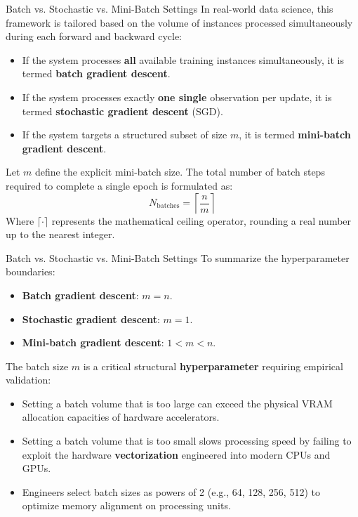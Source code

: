 \begin{frame}{Batch vs. Stochastic vs. Mini-Batch Settings}
	In real-world data science, this framework is tailored based on the volume of instances processed simultaneously during each forward and backward cycle:
	\begin{itemize}
		\item If the system processes \textbf{all} available training instances simultaneously, it is termed \textbf{batch gradient descent}.
		\pause
		\item If the system processes exactly \textbf{one single} observation per update, it is termed \textbf{stochastic gradient descent} (SGD).
		\pause
		\item If the system targets a structured subset of size $m$, it is termed \textbf{mini-batch gradient descent}.
	\end{itemize}
	
	\pause
	\vspace{0.5cm}
	
	Let $m$ define the explicit mini-batch size. The total number of batch steps required to complete a single epoch is formulated as:
	\begin{equation*}
		N_{\text{batches}} = \left\lceil \frac{n}{m} \right\rceil
	\end{equation*}
	Where $\lceil \cdot \rceil$ represents the mathematical ceiling operator, rounding a real number up to the nearest integer.
\end{frame}

\begin{frame}{Batch vs. Stochastic vs. Mini-Batch Settings}
	To summarize the hyperparameter boundaries:
	\begin{itemize}
		\item \textbf{Batch gradient descent}: $m = n$.
		\item \textbf{Stochastic gradient descent}: $m = 1$.
		\item \textbf{Mini-batch gradient descent}: $1 < m < n$.
	\end{itemize}
	
	\pause
	\vspace{0.3cm}
	
	The batch size $m$ is a critical structural \textbf{hyperparameter} requiring empirical validation:
	\begin{itemize}
		\item Setting a batch volume that is too large can exceed the physical VRAM allocation capacities of hardware accelerators.
		\item Setting a batch volume that is too small slows processing speed by failing to exploit the hardware \textbf{vectorization} engineered into modern CPUs and GPUs.
		\item Engineers select batch sizes as powers of 2 (e.g., 64, 128, 256, 512) to optimize memory alignment on processing units.
	\end{itemize}
\end{frame}

